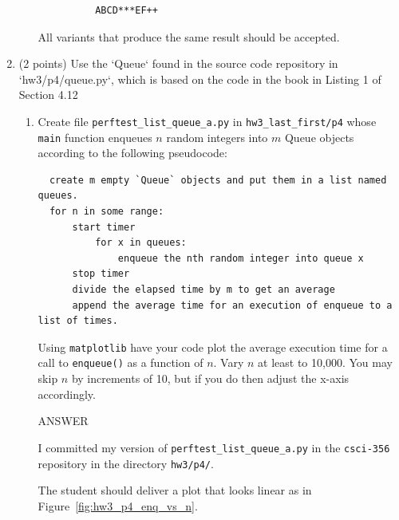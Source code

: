 \documentclass{article} %
\newenvironment{mpage}
  {\hspace{0.1in}
   \begin{minipage}{4.5in}
     \setlength{\parskip}{.5em}
     \vspace{0.1in}}    
  {\vspace{0.1in}
   \end{minipage}}
\begin{document}
\begin{enumerate}
\begin{enumerate}
\begin{mpage}
        \begin{verbatim}
          ABCD***EF++
        \end{verbatim}

      All variants that produce the same result should be accepted.

    \end{mpage}

  \end{enumerate}


  \item (2 points) Use the `Queue` found in the source code
repository in `hw3/p4/queue.py`, which is based on the code in the
book in Listing 1 of Section 4.12


    \begin{enumerate}
  
    \item Create file \verb|perftest_list_queue_a.py| in
      \verb|hw3_last_first/p4| whose \verb|main| function enqueues $n$
      random integers into $m$ Queue objects according to the following
      pseudocode:

\begin{verbatim}
  create m empty `Queue` objects and put them in a list named queues.
  for n in some range:
      start timer
          for x in queues:
              enqueue the nth random integer into queue x
      stop timer
      divide the elapsed time by m to get an average
      append the average time for an execution of enqueue to a list of times.
\end{verbatim}

      Using \verb|matplotlib| have your code plot the average
      execution time for a call to \verb|enqueue()| as a function of
      $n$.  Vary $n$ at least to 10,000.  You may skip $n$ by
      increments of 10, but if you do then adjust the x-axis
      accordingly.

      \begin{mpage}
        ANSWER

        I committed my version of \verb|perftest_list_queue_a.py| in
        the \verb|csci-356| repository in the directory \verb|hw3/p4/|.
      
        The student should deliver a plot that looks linear as in 
        Figure~\ref{fig:hw3_p4_enq_vs_n}.

      \end{mpage}


\end{enumerate}
\end{enumerate}
\end{document}
